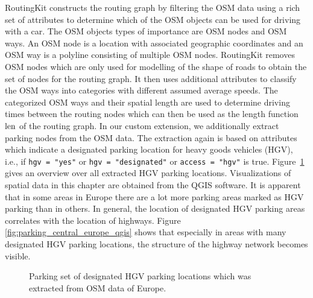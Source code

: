 RoutingKit constructs the routing graph by filtering the OSM data using a rich set of attributes to determine which of the OSM objects can be used for driving with a car. The OSM objects types of importance are OSM nodes and OSM ways. An OSM node is a location with associated geographic coordinates and an OSM way is a polyline consisting of multiple OSM nodes. RoutingKit removes OSM nodes which are only used for modelling of the shape of roads to obtain the set of nodes for the routing graph. It then uses additional attributes to classify the OSM ways into categories with different assumed average speeds. The categorized OSM ways and their spatial length are used to determine driving times between the routing nodes which can then be used as the length function $\operatorname{len}$ of the routing graph. In our custom extension, we additionally extract parking nodes from the OSM data. The extraction again is based on attributes which indicate a designated parking location for heavy goods vehicles (HGV), i.e., if \texttt{hgv = "yes"} or \texttt{hgv = "designated"} or \texttt{access = "hgv"} is true. Figure~\ref{fig:parking_qgis} gives an overview over all extracted HGV parking locations. Visualizations of spatial data in this chapter are obtained from the QGIS software\cite{qgisdevelopmentteam:2022}. It is apparent that in some areas in Europe there are a lot more parking areas marked as HGV parking than in others. In general, the location of designated HGV parking areas correlates with the location of highways. Figure \ref{fig:parking_central_europe_qgis} shows that especially in areas with many designated HGV parking locations, the structure of the highway network becomes visible.

\begin{figure}[hbtp]
	\centering
	\hfill
	\caption{Parking set of designated HGV parking locations which was extracted from OSM data of Europe.}
	\label{fig:parking_qgis}
\end{figure}

